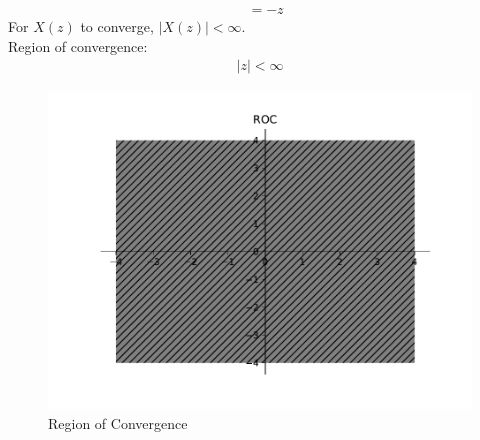 \documentclass[journal,12pt,twocolumn]{IEEEtran}
\providecommand{\abs}[1]{\left\vert#1\right\vert}
\numberwithin{equation}{section}
\begin{document}
\begin{enumerate}[label=\arabic*]
\begin{align}
&=-z
\end{align}
For $X(z)$ to converge, $\abs{X(z)}<\infty$.\\
Region of convergence:
\begin{align}
\abs{z} < \infty
\end{align}
\begin{figure}[!ht]
\begin{centering}
\includegraphics[width=\columnwidth]{./figs/roc}
\end{centering}
\caption{Region of Convergence}
\label{fig:2}	
\end{figure}
\end{enumerate} 
 
\end{document}
